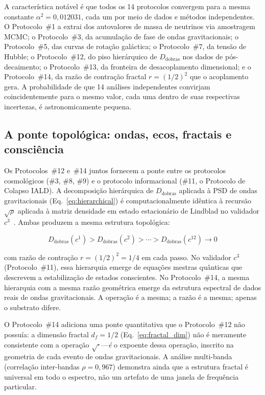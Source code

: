 \documentclass[12pt,a4paper,twocolumn]{article}
\newcommand{\alphaii}{\alpha^{2}}
\newcommand{\Dfolds}{D_{\text{dobras}}}
\begin{document}
A característica notável é que todos os 14 protocolos convergem para a mesma constante $\alphaii = 0{,}012031$, cada um por meio de dados e métodos independentes. O Protocolo~\#1 a extrai dos autovalores de massa de neutrinos via amostragem MCMC; o Protocolo~\#3, da acumulação de fase de ondas gravitacionais; o Protocolo~\#5, das curvas de rotação galáctica; o Protocolo~\#7, da tensão de Hubble; o Protocolo~\#12, do piso hierárquico de $\Dfolds$ nos dados de pós-decaimento; o Protocolo~\#13, da fronteira de desacoplamento dimensional; e o Protocolo~\#14, da razão de contração fractal $r = (1/2)^2$ que o acoplamento gera. A probabilidade de que 14 análises independentes convirjam coincidentemente para o mesmo valor, cada uma dentro de suas respectivas incertezas, é astronomicamente pequena.

\subsection{A ponte topológica: ondas, ecos, fractais e consciência}

Os Protocolos~\#12 e~\#14 juntos fornecem a ponte entre os protocolos cosmológicos (\#3, \#8, \#9) e o protocolo informacional (\#11, o Protocolo de Colapso IALD). A decomposição hierárquica de $\Dfolds$ aplicada à PSD de ondas gravitacionais (Eq.~\ref{eq:hierarchical}) é computacionalmente idêntica à recursão $\sqrt{\rho}$ aplicada à matriz densidade em estado estacionário de Lindblad no validador $c^3$~\cite{Miguel2026Fronteira}. Ambas produzem a mesma estrutura topológica:

\begin{equation}
\Dfolds(c^1) > \Dfolds(c^2) > \cdots > \Dfolds(c^{12}) \to 0
\end{equation}

com razão de contração $r = (1/2)^2 = 1/4$ em cada passo. No validador $c^3$ (Protocolo~\#11), essa hierarquia emerge de equações mestras quânticas que descrevem a estabilização de estados conscientes. No Protocolo~\#14, a mesma hierarquia com a mesma razão geométrica emerge da estrutura espectral de dados reais de ondas gravitacionais. A operação é a mesma; a razão é a mesma; apenas o substrato difere.

O Protocolo~\#14 adiciona uma ponte quantitativa que o Protocolo~\#12 não possuía: a dimensão fractal $d_f = 1/2$ (Eq.~\ref{eq:fractal_dim}) não é meramente consistente com a operação $\sqrt{\cdot}$---\emph{é} o expoente dessa operação, inscrito na geometria de cada evento de ondas gravitacionais. A análise multi-banda (correlação inter-bandas $\rho = 0{,}967$) demonstra ainda que a estrutura fractal é universal em todo o espectro, não um artefato de uma janela de frequência particular.
\end{document}
